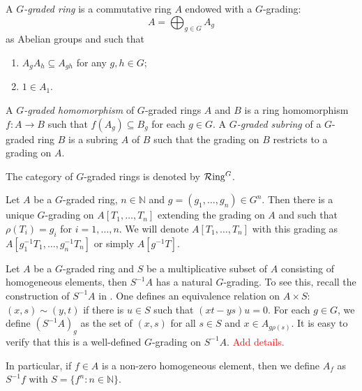 \begin{definition}
    A \emph{$G$-graded ring} is a commutative ring $A$ endowed with a $G$-grading:
    \[
        A=\bigoplus_{g\in G} A_g  
    \]
    as Abelian groups and such that 
    \begin{enumerate}
        \item $A_{g}A_{h}\subseteq A_{gh}$ for any $g,h\in G$;
        \item $1\in A_1$.
    \end{enumerate}

    

    A \emph{$G$-graded homomorphism} of $G$-graded rings $A$ and $B$ is a ring homomorphism $f:A\rightarrow B$ such that $f(A_g)\subseteq B_g$ for each $g\in G$. A \emph{$G$-graded subring}  of a $G$-graded ring $B$ is a subring $A$ of $B$ such that the grading on $B$ restricts to a grading on $A$.

    The category of $G$-graded rings is denoted by $\mathcal{R}\mathrm{ing}^G$.
\end{definition}

\begin{example}
    Let $A$ be a $G$-graded ring, $n\in \mathbb{N}$ and $g=(g_1,\ldots,g_n)\in G^n$. Then there is a unique $G$-grading on $A[T_1,\ldots,T_n]$ extending the grading on $A$ and such that $\rho(T_i)=g_i$ for $i=1,\ldots,n$. We will denote $A[T_1,\ldots,T_n]$ with this grading as $A[g_{1}^{-1}T_1,\ldots,g_{n}^{-1}T_n]$ or simply $A[g^{-1}T]$.
\end{example}

\begin{example}\label{ex-localizationgradedring}
    Let $A$ be a $G$-graded ring and $S$ be a multiplicative subset of $A$ consisting of homogeneous elements, then $S^{-1}A$ has a natural $G$-grading. To see this, recall the construction of $S^{-1}A$ in \cite[\href{https://stacks.math.columbia.edu/tag/00CM}{Tag 00CM}]{stacks-project}. One defines an equivalence relation on $A\times S$: $(x,s)\sim (y,t)$ if there is $u\in S$ such that $(xt-ys)u=0$. For each $g\in G$, we define $(S^{-1}A)_g$ as the set of $(x,s)$ for all $s\in S$ and $x\in A_{g\rho(s)}$. It is easy to verify that this is a well-defined $G$-grading on $S^{-1}A$.  \textcolor{red}{Add details.}

    In particular, if $f\in A$ is a non-zero homogeneous element, then we define $A_f$ as $S^{-1}f$ with $S=\{f^n:n\in \mathbb{N}\}$.
\end{example}

